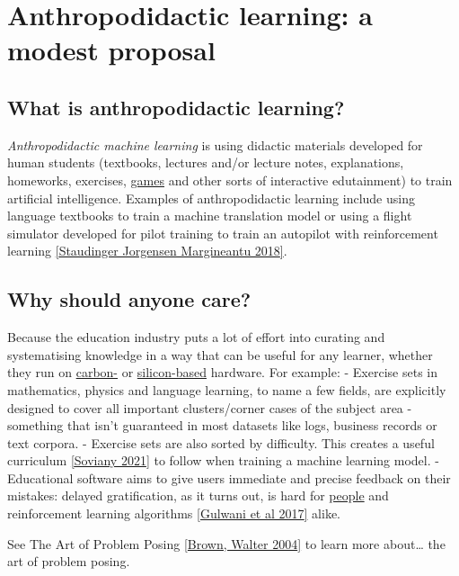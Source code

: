 \section{Anthropodidactic learning: a modest proposal}


\subsection{What is anthropodidactic learning?}

\emph{Anthropodidactic machine learning} is using didactic materials
developed for human students (textbooks, lectures and/or lecture notes,
explanations, homeworks, exercises, \href{http://www.virtu-als.com/}{games} and other
sorts of interactive edutainment) to train artificial intelligence.
Examples of anthropodidactic learning include using language textbooks
to train a machine translation model or using a flight simulator
developed for pilot training to train an autopilot with reinforcement
learning \href{https://openreview.net/pdf?id=H1mMHwt9X}{{[}Staudinger
Jorgensen Margineantu 2018{]}}.


\subsection{Why should anyone care?}\label{why-should-anyone-care}

Because the education industry puts a lot of effort into curating and
systematising knowledge in a way that can be useful for any learner,
whether they run on
\href{https://en.wikipedia.org/wiki/Human_brain}{carbon-} or
\href{https://en.wikipedia.org/wiki/Central_processing_unit}{silicon-based}
hardware. For example: - Exercise sets in mathematics, physics and
language learning, to name a few fields, are explicitly designed to
cover all important clusters/corner cases of the subject area -
something that isn't guaranteed in most datasets like logs, business
records or text corpora. - Exercise sets are also sorted by difficulty.
This creates a useful curriculum
\href{https://arxiv.org/abs/2101.10382}{{[}Soviany 2021{]}} to follow
when training a machine learning model. - Educational software aims to
give users immediate and precise feedback on their mistakes: delayed
gratification, as it turns out, is hard for
\href{https://en.wikipedia.org/wiki/Stanford_marshmallow_experiment}{people}
and reinforcement learning algorithms
\href{https://www.nowpublishers.com/article/Details/PGL-010}{{[}Gulwani
et al 2017{]}} alike.

See The Art of Problem Posing
\href{https://www.taylorfrancis.com/books/mono/10.4324/9781410611833/art-problem-posing-stephen-brown-marion-walter}{{[}Brown,
Walter 2004{]}} to learn more about\ldots{} the art of problem posing.


